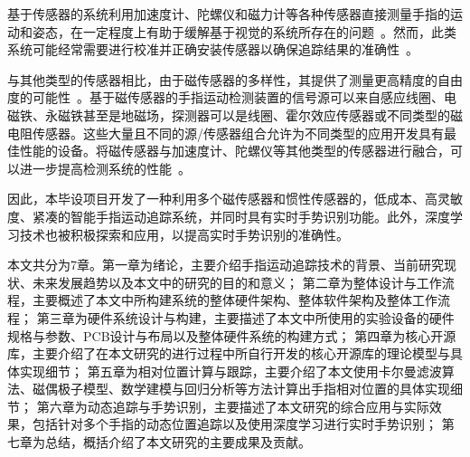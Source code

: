 基于传感器的系统利用加速度计、陀螺仪和磁力计等各种传感器直接测量手指的运动和姿态，在一定程度上有助于缓解基于视觉的系统所存在的问题~\cite{introArticle12}。然而，此类系统可能经常需要进行校准并正确安装传感器以确保追踪结果的准确性~\cite{introArticle15}。

与其他类型的传感器相比，由于磁传感器的多样性，其提供了测量更高精度的自由度的可能性~\cite{introArticle16}。基于磁传感器的手指运动检测装置的信号源可以来自感应线圈、电磁铁、永磁铁甚至是地磁场，探测器可以是线圈、霍尔效应传感器或不同类型的磁电阻传感器。这些大量且不同的源/传感器组合允许为不同类型的应用开发具有最佳性能的设备。将磁传感器与加速度计、陀螺仪等其他类型的传感器进行融合，可以进一步提高检测系统的性能~\cite{introArticle17}。

因此，本毕设项目开发了一种利用多个磁传感器和惯性传感器的，低成本、高灵敏度、紧凑的智能手指运动追踪系统，并同时具有实时手势识别功能。此外，深度学习技术也被积极探索和应用，以提高实时手势识别的准确性。

本文共分为7章。第一章为绪论，主要介绍手指运动追踪技术的背景、当前研究现状、未来发展趋势以及本文中的研究的目的和意义；
第二章为整体设计与工作流程，主要概述了本文中所构建系统的整体硬件架构、整体软件架构及整体工作流程；
第三章为硬件系统设计与构建，主要描述了本文中所使用的实验设备的硬件规格与参数、PCB设计与布局以及整体硬件系统的构建方式；
第四章为核心开源库，主要介绍了在本文研究的进行过程中所自行开发的核心开源库的理论模型与具体实现细节；
第五章为相对位置计算与跟踪，主要介绍了本文使用卡尔曼滤波算法、磁偶极子模型、数学建模与回归分析等方法计算出手指相对位置的具体实现细节；
第六章为动态追踪与手势识别，主要描述了本文研究的综合应用与实际效果，包括针对多个手指的动态位置追踪以及使用深度学习进行实时手势识别；
第七章为总结，概括介绍了本文研究的主要成果及贡献。
